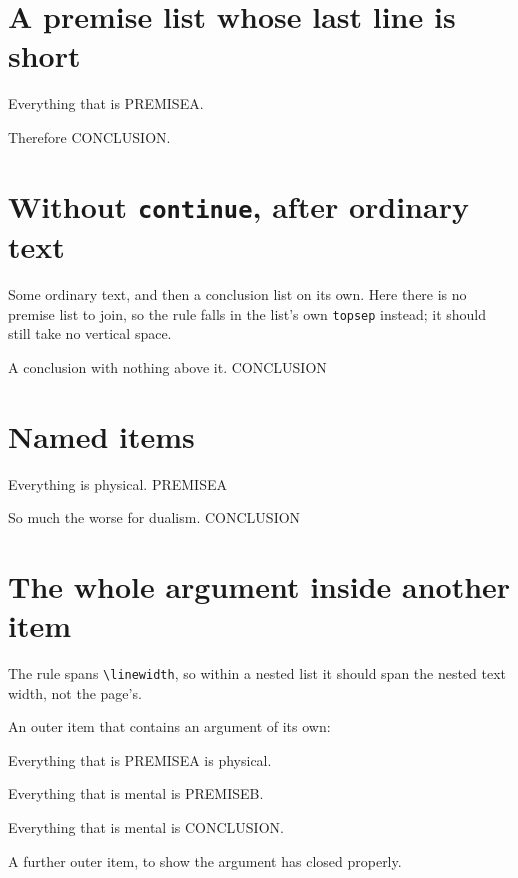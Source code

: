 \documentclass{article}
\newcommand\PA{PREMISEA}
\newcommand\PB{PREMISEB}
\newcommand\CC{CONCLUSION}
\begin{document}
\section{A premise list whose last line is short}

\begin{prop}
  \item Everything that is \PA.
\end{prop}
\begin{prop}[style=conclusion, continue=true]
  \item Therefore \CC.
\end{prop}

\section{Without \texttt{continue}, after ordinary text}

Some ordinary text, and then a conclusion list on its own.  Here there is no
premise list to join, so the rule falls in the list's own \texttt{topsep}
instead; it should still take no vertical space.

\begin{prop}[style=conclusion]
  \item A conclusion with nothing above it. \CC
\end{prop}

\section{Named items}

\begin{prop}
  \item[Physicalism] Everything is physical. \PA
\end{prop}
\begin{prop}[style=conclusion, continue=true]
  \item[Conclusion] So much the worse for dualism. \CC
\end{prop}

\section{The whole argument inside another item}

The rule spans \verb|\linewidth|, so within a nested list it should span the
nested text width, not the page's.

\begin{prop}
  \item An outer item that contains an argument of its own:
  \begin{prop}
    \item Everything that is \PA{} is physical.
    \item Everything that is mental is \PB.
  \end{prop}
  \begin{prop}[style=conclusion, continue=true]
    \item Everything that is mental is \CC.
  \end{prop}
  \item A further outer item, to show the argument has closed properly.
\end{prop}
\end{document}
